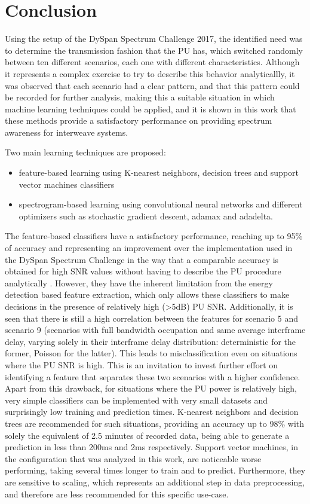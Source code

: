 \chapter{Conclusion}\label{chapter:conclusion} \label{ch:conclusions}
Using the setup of the DySpan Spectrum Challenge 2017, the identified need was to determine the transmission fashion that the \ac{PU} has, which switched randomly between ten different scenarios, each one with different characteristics. Although it represents a complex exercise to try to describe this behavior analyticallly, it was observed that each scenario had a clear pattern, and that this pattern could be recorded for further analysis, making this a suitable situation in which machine learning techniques could be applied, and it is shown in this work that these methods provide a satisfactory performance on providing spectrum awareness for interweave systems.

Two main learning techniques are proposed:

\begin{itemize}
    \item feature-based learning using K-nearest neighbors, decision trees and support vector machines classifiers
    \item spectrogram-based learning using convolutional neural networks and different optimizers such as stochastic gradient descent, adamax and adadelta.
\end{itemize}

The feature-based classifiers have a satisfactory performance, reaching up to 95\% of accuracy and representing an improvement over the implementation used in the DySpan Spectrum Challenge in the way that a comparable accuracy is obtained for high SNR values without having to describe the PU procedure analytically . However, they have the inherent limitation from the energy detection based feature extraction, which only allows these classifiers to make decisions in the presence of relatively high (>5dB) PU SNR. Additionally, it is seen that there is still a high correlation between the features for scenario 5 and scenario 9 (scenarios with full bandwidth occupation and same average interframe delay, varying solely in their interframe delay distribution: deterministic for the former, Poisson for the latter). This leads to misclassification even on situations where the \ac{PU} \ac{SNR} is high. This is an invitation to invest further effort on identifying a feature that separates these two scenarios with a higher confidence. Apart from this drawback, for situations where the \ac{PU} power is relatively high, very simple classifiers can be implemented with very small datasets and surprisingly low training and prediction times. K-nearest neighbors and decision trees are recommended for such situations, providing an accuracy up to 98\% with solely the equivalent of 2.5 minutes of recorded data, being able to generate a prediction in less than 200ms and 2ms respectively. Support vector machines, in the configuration that was analyzed in this work, are noticeable worse performing, taking several times longer to train and to predict. Furthermore, they are sensitive to scaling, which represents an additional step in data preprocessing, and therefore are less recommended for this specific use-case.


